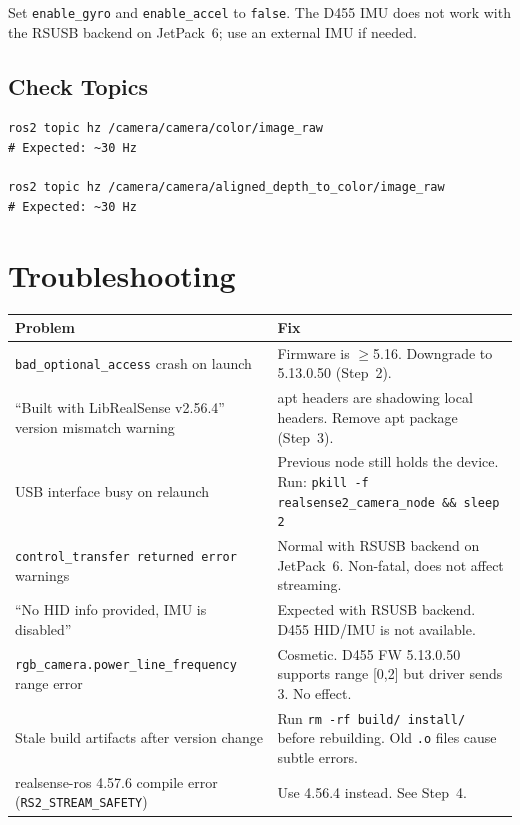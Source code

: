 \documentclass[11pt]{article}
\begin{document}
Set \texttt{enable\_gyro} and \texttt{enable\_accel} to \texttt{false}. The D455 IMU does not work with the RSUSB backend on JetPack~6; use an external IMU if needed.

\subsection*{Check Topics}

\begin{lstlisting}
ros2 topic hz /camera/camera/color/image_raw
# Expected: ~30 Hz

ros2 topic hz /camera/camera/aligned_depth_to_color/image_raw
# Expected: ~30 Hz
\end{lstlisting}

\section{Troubleshooting}

\begin{tabular}{@{}p{}p{}@{}}
    \toprule
    Problem & Fix \\
    \midrule
    \texttt{bad\_optional\_access} crash on launch &
    Firmware is $\geq$5.16. Downgrade to 5.13.0.50 (Step~2). \\

    \addlinespace
    ``Built with LibRealSense v2.56.4'' version mismatch warning &
    apt headers are shadowing local headers. Remove apt package (Step~3). \\

    \addlinespace
    USB interface busy on relaunch &
    Previous node still holds the device. Run: \texttt{pkill -f realsense2\_camera\_node \&\& sleep 2} \\

    \addlinespace
    \texttt{control\_transfer returned error} warnings &
    Normal with RSUSB backend on JetPack~6. Non-fatal, does not affect streaming. \\

    \addlinespace
    ``No HID info provided, IMU is disabled'' &
    Expected with RSUSB backend. D455 HID/IMU is not available. \\

    \addlinespace
    \texttt{rgb\_camera.power\_line\_frequency} range error &
    Cosmetic. D455 FW 5.13.0.50 supports range [0,2] but driver sends 3. No effect. \\

    \addlinespace
    Stale build artifacts after version change &
    Run \texttt{rm -rf build/ install/} before rebuilding. Old \texttt{.o} files cause subtle errors. \\

    \addlinespace
    realsense-ros 4.57.6 compile error (\texttt{RS2\_STREAM\_SAFETY}) &
    Use 4.56.4 instead. See Step~4. \\
    \bottomrule
\end{tabular}
\end{document}
